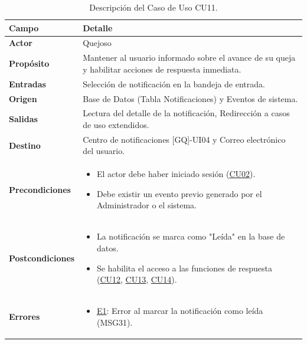 \begin{appendices}
\begin{table}[htbp]
\centering
\small
\begin{tabular}{|p{3.5cm}|p{10.5cm}|}
\hline
\rowcolor[HTML]{EFEFEF} 
\textbf{Campo} & \textbf{Detalle} \\ \hline
\textbf{Actor} & Quejoso \\ \hline
\textbf{Propósito} & Mantener al usuario informado sobre el avance de su queja y habilitar acciones de respuesta inmediata. \\ \hline
\textbf{Entradas} & Selección de notificación en la bandeja de entrada. \\ \hline
\textbf{Origen} & Base de Datos (Tabla Notificaciones) y Eventos de sistema. \\ \hline
\textbf{Salidas} & Lectura del detalle de la notificación, Redirección a casos de uso extendidos. \\ \hline
\textbf{Destino} & Centro de notificaciones [GQ]-UI04 y Correo electrónico del usuario. \\ \hline
\textbf{Precondiciones} & 
\begin{itemize}[nosep, leftmargin=*]
    \item El actor debe haber iniciado sesión (\hyperlink{anexo:casos_uso}{CU02}).
    \item Debe existir un evento previo generado por el Administrador o el sistema.
\end{itemize} \\ \hline
\textbf{Postcondiciones} & 
\begin{itemize}[nosep, leftmargin=*]
    \item La notificación se marca como "Leída" en la base de datos.
    \item Se habilita el acceso a las funciones de respuesta (\hyperlink{anexo:casos_uso}{CU12}, \hyperlink{anexo:casos_uso}{CU13}, \hyperlink{anexo:casos_uso}{CU14}).
\end{itemize} \\ \hline
\textbf{Errores} & 
\begin{itemize}[nosep, leftmargin=*]
    \item \hyperlink{err:E16}{E1}: Error al marcar la notificación como leída (MSG31).
\end{itemize} \\ \hline
\end{tabular}
\caption{Descripción del Caso de Uso CU11.}
\label{tab:cu11_especificacion}
\end{table}


\end{appendices}
